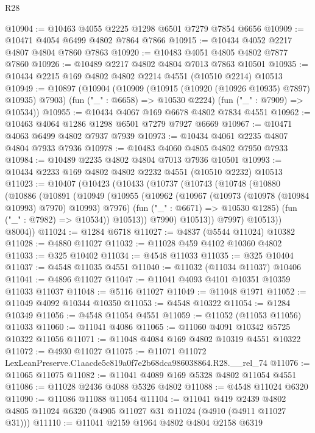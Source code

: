 \begin{lexlean}{R28}
\begin{coremodule}
@10904 := @10463 @4055 @2225 @1298 @6501 @7279 @7854 @6656
@10909 := @10471 @4054 @6499 @4802 @7864 @7866
@10915 := @10434 @4052 @2217 @4807 @4804 @7860 @7863
@10920 := @10483 @4051 @4805 @4802 @7877 @7860
@10926 := @10489 @2217 @4802 @4804 @7013 @7863 @10501
@10935 := @10434 @2215 @169 @4802 @4802 @2214 @4551 (@10510 @2214) @10513
@10949 := @10897
    (@10904
      (@10909 (@10915 (@10920 (@10926 @10935) @7897) @10935) @7903)
      (fun ("_" : @6658) => @10530 @2224)
      (fun ("_" : @7909) => @10534))
@10955 := @10434 @4067 @169 @6678 @4802 @7834 @4551
@10962 := @10463 @4064 @1286 @1298 @6501 @7279 @7927 @6669
@10967 := @10471 @4063 @6499 @4802 @7937 @7939
@10973 := @10434 @4061 @2235 @4807 @4804 @7933 @7936
@10978 := @10483 @4060 @4805 @4802 @7950 @7933
@10984 := @10489 @2235 @4802 @4804 @7013 @7936 @10501
@10993 := @10434 @2233 @169 @4802 @4802 @2232 @4551 (@10510 @2232) @10513
@11023 := @10407
    (@10423
      (@10433
        (@10737
          (@10743
            (@10748
              (@10880
                (@10886
                  (@10891
                    (@10949
                      (@10955
                        (@10962
                          (@10967 (@10973 (@10978 (@10984 @10993) @7970) @10993) @7976)
                          (fun ("_" : @6671) => @10530 @1285)
                          (fun ("_" : @7982) => @10534))
                        @10513))
                    @7990)
                  @10513))
              @7997)
            @10513))
        @8004))
@11024 := @1284 @6718
@11027 := @4837 (@5544 @11024) @10382
@11028 := @4880 @11027
@11032 := @11028 @459 @4102 @10360 @4802
@11033 := @325 @10402
@11034 := @4548 @11033
@11035 := @325 @10404
@11037 := @4548 @11035 @4551
@11040 := @11032 (@11034 @11037) @10406
@11041 := @4896 @11027
@11047 := @11041 @4093 @4101 @10351 @10359 @11033 @11037
@11048 := @5116 @11027
@11049 := @11048 @1971
@11052 := @11049 @4092 @10344 @10350
@11053 := @4548 @10322
@11054 := @1284 @10349
@11056 := @4548 @11054 @4551
@11059 := @11052 (@11053 @11056) @11033
@11060 := @11041 @4086
@11065 := @11060 @4091 @10342 @5725 @10322 @11056
@11071 := @11048 @4084 @169 @4802 @10319 @4551 @10322
@11072 := @4930 @11027
@11075 := @11071 @11072 LexLeanPreserve.C1aacde5c819a0f7e2b68dca986038864.R28.__rel_74
@11076 := @11065 @11075
@11082 := @11041 @4089 @169 @5328 @4802 @11054 @4551
@11086 := @11028 @2436 @4088 @5326 @4802
@11088 := @4548 @11024 @6320
@11090 := @11086 @11088 @11054
@11104 := @11041
    @419
    @2439
    @4802
    @4805
    @11024
    @6320
    (@4905 @11027 @31 @11024 (@4910 (@4911 @11027 @31)))
@11110 := @11041 @2159 @1964 @4802 @4804 @2158 @6319

\end{coremodule}
\end{lexlean}
